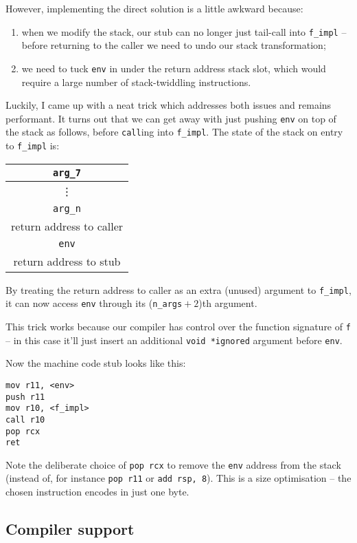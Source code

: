 \documentclass[12pt,a4paper,twoside,openright]{report}
\begin{document}
However, implementing the direct solution is a little awkward because:
\begin{enumerate}
  \item when we modify the stack, our stub can no longer just tail-call
    into \lstinline!f_impl! -- before returning to the caller we need to undo
    our stack transformation;
  \item we need to tuck \lstinline!env! in under the return address
    stack slot, which would require a large number of stack-twiddling
    instructions.
\end{enumerate}

Luckily, I came up with a neat trick which addresses both issues and remains
performant. It turns out that we can get away with just pushing \lstinline!env!
on top of the stack as follows, before \lstinline!call!ing into
\lstinline!f_impl!. The state of the stack on entry to \lstinline!f_impl! is:

\begin{tabular}{c}
  \lstinline!arg_7!
  \\ \hline
  \vdots
  \\ \hline
  \lstinline!arg_n!
  \\ \hline
  return address to caller
  \\ \hline
  \lstinline!env!
  \\ \hline\hline
  return address to stub
\end{tabular}

By treating the return address to caller as an extra (unused) argument to
\lstinline!f_impl!, it can now access \lstinline!env! through its
(\lstinline{n_args}${}+2$)th argument.

This trick works because our compiler has control over the function signature
of \lstinline{f} -- in this case it'll just insert an additional
\lstinline{void *ignored} argument before \lstinline{env}.

Now the machine code stub looks like this:

\begin{lstlisting}
mov r11, <env>
push r11
mov r10, <f_impl>
call r10
pop rcx
ret
\end{lstlisting}

Note the deliberate choice of \lstinline{pop rcx} to remove the
\lstinline{env} address from the stack (instead of, for instance
\lstinline{pop r11} or \lstinline{add rsp, 8}). This is a size optimisation --
the chosen instruction encodes in just one byte.

\subsection{Compiler support}\label{closures-compiler-support}
\end{document}
